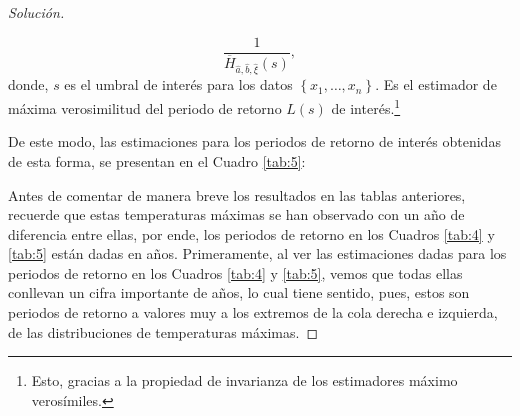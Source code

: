 \documentclass[10.5pt,notitlepage]{article}
\newenvironment{solucion}
  {\begin{proof}[Solución]}
  {\end{proof}}
\newcommand{\kis}[1]{\left\{ #1 \right\}}
\theoremstyle{plain}
\begin{document}
\begin{solucion}
\begin{itemize}
    \[
    \frac{1}{\overline{H}_{\hat{a}, \hat{b}, \hat{\xi}}(s)},
    \]
    donde, \(s\) es el umbral de interés para los datos \(\kis{x_1, \hdots, x_n}\). Es el estimador de máxima verosimilitud del periodo de retorno \(L(s)\) de interés.\footnote{Esto, gracias a la propiedad de invarianza de los estimadores máximo verosímiles.} 
\end{itemize}
De este modo, las estimaciones para los periodos de retorno de interés obtenidas de esta forma, se presentan en el Cuadro \ref{tab:5}:
\begin{table}[H]
        \centering
        \caption{Estimaciones de los periodos de retorno solicitados, ajustando una DGVE a los datos de temperaturas máximas y negativos de temperaturas máximas.}
        \label{tab:5}
\end{table}
Antes de comentar de manera breve los resultados en las tablas anteriores, recuerde que estas temperaturas máximas se han observado con un año de diferencia entre ellas, por ende, los periodos de retorno en los Cuadros \ref{tab:4} y \ref{tab:5} están dadas en años.
Primeramente, al ver las estimaciones dadas para los periodos de retorno en los Cuadros  \ref{tab:4} y \ref{tab:5}, vemos que todas ellas conllevan un cifra importante de años, lo cual tiene sentido, pues, estos son periodos de retorno a valores muy a los extremos de la cola derecha e izquierda, de las distribuciones de temperaturas máximas.

\end{solucion}
\end{document}
